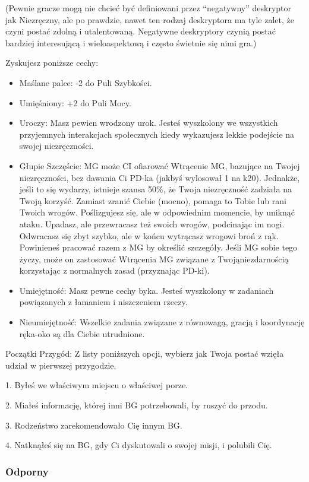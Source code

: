 (Pewnie gracze mogą nie chcieć być definiowani przez “negatywny” deskryptor jak Niezręczny, ale po prawdzie, nawet ten rodzaj deskryptora ma tyle zalet, że czyni postać zdolną i utalentowaną. Negatywne deskryptory czynią postać bardziej interesującą i wieloaspektową i często świetnie się nimi gra.)

Zyskujesz poniższe cechy:
\begin{itemize}
\item Maślane palce: -2 do Puli Szybkości.
\item  Umięśniony: +2 do Puli Mocy.
\item Uroczy: Masz pewien wrodzony urok. Jesteś wyszkolony we wszystkich przyjemnych interakcjach społecznych kiedy wykazujesz lekkie podejście na swojej niezręczności.
\item  Głupie Szczęście: MG może CI ofiarować Wtrącenie MG, bazujące na Twojej niezręczności, bez dawania Ci PD-ka (jakbyś wylosował 1 na k20). Jednakże, jeśli to się wydarzy, istnieje szansa 50\%, że Twoja niezręczność zadziała na Twoją korzyść. Zamiast zranić Ciebie (mocno), pomaga to Tobie lub rani Twoich wrogów. Poślizgujesz się, ale w odpowiednim momencie, by uniknąć ataku. Upadasz, ale przewracasz też swoich wrogów, podcinając im nogi. Odwracasz się zbyt szybko, ale w końcu wytrącasz wrogowi broń z rąk. Powinieneś pracować razem z MG by określić szczegóły. Jeśli MG sobie tego życzy, może on zastosować Wtrącenia MG związane z Twojąniezdarnością korzystając z normalnych zasad (przyznając PD-ki).
\item Umiejętność: Masz pewne cechy byka. Jesteś wyszkolony w zadaniach powiązanych z łamaniem i niszczeniem rzeczy.
\item Nieumiejętność: Wszelkie zadania związane z równowagą, gracją i koordynację ręka-oko są dla Ciebie utrudnione. 
\end{itemize}

Początki Przygód: Z listy poniższych opcji, wybierz jak Twoja postać wzięła udział w pierwszej przygodzie.

1. Byłeś we właściwym miejscu o właściwej porze.

2. Miałeś informację, której inni BG potrzebowali, by ruszyć do przodu.

3. Rodzeństwo zarekomendowało Cię innym BG.

4. Natknąłeś się na BG, gdy Ci dyskutowali o swojej misji, i polubili Cię.

\subsubsection{Odporny}

